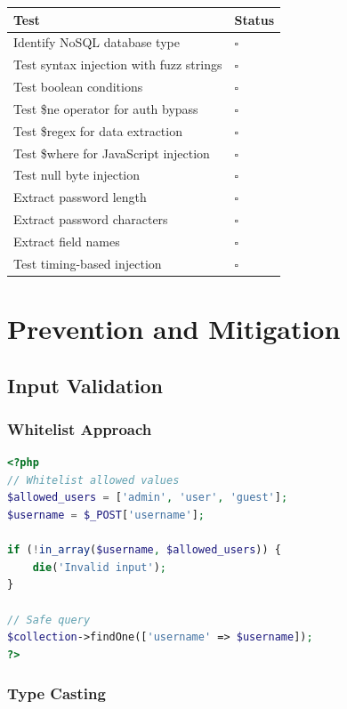 \documentclass[12pt]{article}
\begin{document}
\begin{longtable}{|p{5cm}|p{5cm}|}
\hline
\textbf{Test} & \textbf{Status} \\
\hline
Identify NoSQL database type & $\square$ \\
\hline
Test syntax injection with fuzz strings & $\square$ \\
\hline
Test boolean conditions & $\square$ \\
\hline
Test \$ne operator for auth bypass & $\square$ \\
\hline
Test \$regex for data extraction & $\square$ \\
\hline
Test \$where for JavaScript injection & $\square$ \\
\hline
Test null byte injection & $\square$ \\
\hline
Extract password length & $\square$ \\
\hline
Extract password characters & $\square$ \\
\hline
Extract field names & $\square$ \\
\hline
Test timing-based injection & $\square$ \\
\hline
\end{longtable}

\section{Prevention and Mitigation}

\subsection{Input Validation}

\subsubsection{Whitelist Approach}

\begin{lstlisting}[language=PHP]
<?php
// Whitelist allowed values
$allowed_users = ['admin', 'user', 'guest'];
$username = $_POST['username'];

if (!in_array($username, $allowed_users)) {
    die('Invalid input');
}

// Safe query
$collection->findOne(['username' => $username]);
?>
\end{lstlisting}

\subsubsection{Type Casting}
\end{document}

